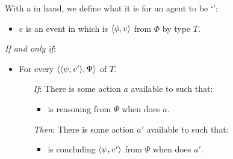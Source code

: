 \begin{note}
  With a \torN{} in hand, we define what it is for an agent to be `':

  \begin{definition}[\ptC{2}]
    \label{def:ptC}

    \noindent%

    \begin{itemize}
    \item
      \(e\) is an event in which \vAgent{} is \emph{} \(\langle \phi, v \rangle\) from \(\Phi\) by type \(T\).
    \end{itemize}

    \emph{If and only if}:

    \begin{itemize}[noitemsep]
    \item
      For every \tI{} \(\langle \langle \psi, v' \rangle, \Psi \rangle\) of \(T\).
      \begin{itemize}[noitemsep]
      \item[\emph{If}:]
        There is some action \(a\) available to \vAgent{} such that:
        \begin{itemize}
        \item
          \vAgent{} is reasoning from \(\Psi\) when \vAgent{} does \(a\).
        \end{itemize}
      \item[\emph{Then}:]
        There is some action \(a'\) available to \vAgent{} such that:
        \begin{itemize}
        \item
          \vAgent{} is concluding \(\langle \psi, v' \rangle\) from \(\Psi\) when \vAgent{} does \(a'\).
        \end{itemize}
      \end{itemize}
    \end{itemize}
    \vspace{-\baselineskip}
  \end{definition}


\end{note}
